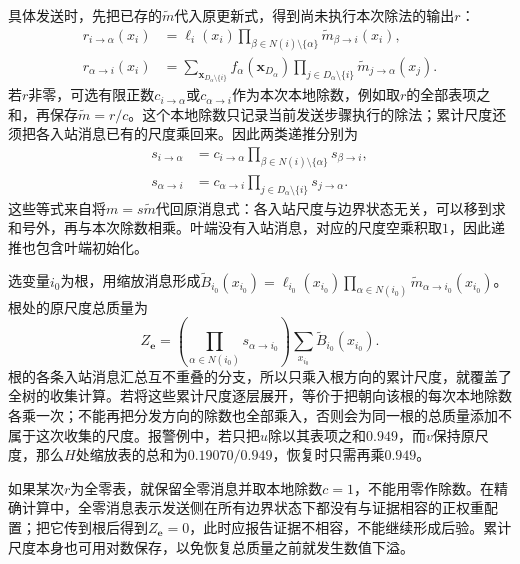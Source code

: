 具体发送时，先把已存的$\widetilde m$代入原更新式，得到尚未执行本次除法的输出$r$：
\[
  \begin{aligned}
    r_{i\to\alpha}(x_i)
      &=\ell_i(x_i)\prod_{\beta\in N(i)\setminus\{\alpha\}}
        \widetilde m_{\beta\to i}(x_i),\\
    r_{\alpha\to i}(x_i)
      &=\sum_{\bm{x}_{D_\alpha\setminus\{i\}}}
        f_\alpha(\bm{x}_{D_\alpha})
        \prod_{j\in D_\alpha\setminus\{i\}}
        \widetilde m_{j\to\alpha}(x_j).
  \end{aligned}
\]
若$r$非零，可选有限正数$c_{i\to\alpha}$或$c_{\alpha\to i}$作为本次本地除数，例如取$r$的全部表项之和，再保存$\widetilde m=r/c$。这个本地除数只记录当前发送步骤执行的除法；累计尺度还须把各入站消息已有的尺度乘回来。因此两类递推分别为
\begin{equation}
  \begin{aligned}
    s_{i\to\alpha}
      &=c_{i\to\alpha}
        \prod_{\beta\in N(i)\setminus\{\alpha\}}s_{\beta\to i},\\
    s_{\alpha\to i}
      &=c_{\alpha\to i}
        \prod_{j\in D_\alpha\setminus\{i\}}s_{j\to\alpha}.
  \end{aligned}
  \label{eq:pgm-junction-tree-factor-message-scales}
\end{equation}
这些等式来自将$m=s\widetilde m$代回原消息式：各入站尺度与边界状态无关，可以移到求和号外，再与本次除数相乘。叶端没有入站消息，对应的尺度空乘积取$1$，因此递推也包含叶端初始化。

选变量$i_0$为根，用缩放消息形成$\widetilde B_{i_0}(x_{i_0})=\ell_{i_0}(x_{i_0})\prod_{\alpha\in N(i_0)}\widetilde m_{\alpha\to i_0}(x_{i_0})$。根处的原尺度总质量为
\begin{equation}
  Z_{\bm e}
    =\left(\prod_{\alpha\in N(i_0)}s_{\alpha\to i_0}\right)
      \sum_{x_{i_0}}\widetilde B_{i_0}(x_{i_0}).
  \label{eq:pgm-junction-tree-factor-root-scale}
\end{equation}
根的各条入站消息汇总互不重叠的分支，所以只乘入根方向的累计尺度，就覆盖了全树的收集计算。若将这些累计尺度逐层展开，等价于把朝向该根的每次本地除数各乘一次；不能再把分发方向的除数也全部乘入，否则会为同一根的总质量添加不属于这次收集的尺度。报警例中，若只把$u$除以其表项之和$0.949$，而$v$保持原尺度，那么$H$处缩放表的总和为$0.19070/0.949$，恢复时只需再乘$0.949$。

如果某次$r$为全零表，就保留全零消息并取本地除数$c=1$，不能用零作除数。在精确计算中，全零消息表示发送侧在所有边界状态下都没有与证据相容的正权重配置；把它传到根后得到$Z_{\bm e}=0$，此时应报告证据不相容，不能继续形成后验。累计尺度本身也可用对数保存，以免恢复总质量之前就发生数值下溢。

